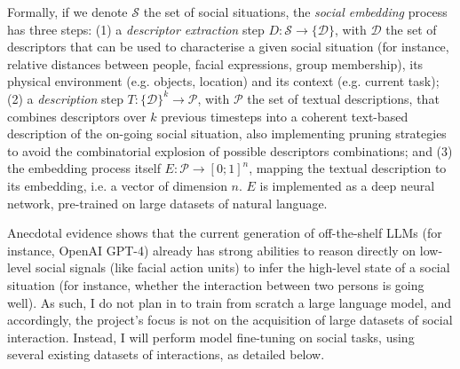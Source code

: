 Formally, if we denote $\mathcal{S}$ the set of social situations, the
\emph{social embedding} process has three steps: (1) a \emph{descriptor
extraction} step $D : \mathcal{S} \to \{\mathcal{D}\}$, with $\mathcal{D}$ the
set of descriptors that can be used to characterise a given social situation
(for instance, relative distances between people, facial expressions, group
membership), its physical environment (e.g. objects, location) and its context
(e.g. current task); (2) a \emph{description} step $T: \{\mathcal{D}\}^k \to
\mathcal{P}$, with $\mathcal{P}$ the set of textual descriptions, that combines
descriptors over $k$ previous timesteps into a coherent text-based description
of the on-going social situation, also implementing pruning strategies to avoid
the combinatorial explosion of possible descriptors combinations; and (3) the
embedding process itself $E : \mathcal{P} \to [0;1]^n$, mapping the textual
description to its embedding, i.e.  a vector of dimension $n$. $E$ is
implemented as a deep neural network, pre-trained on large datasets of natural
language.

Anecdotal evidence shows that the current generation of off-the-shelf LLMs (for
instance, OpenAI GPT-4) already has strong abilities to reason directly on
low-level social signals (like facial action units) to infer the high-level
state of a social situation (for instance, whether the interaction between two
persons is going well). As such, I do not plan in \project to train from scratch
a large language model, and accordingly, the project's focus is not on the
acquisition of large datasets of social interaction. Instead, I will perform
model fine-tuning on social tasks, using several existing datasets of
interactions, as detailed below.


%
%

